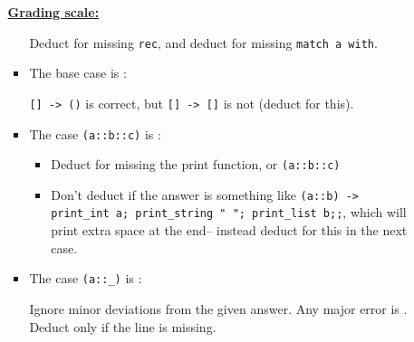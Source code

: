 \documentclass[11pt,fleqn]{article}
\begin{document}
\begin{enumerate}
\begin{enumerate}
\begin{info}{\textbf{\underline{Grading scale:}}}
\begin{itemize}
                            \smallskip

                            Deduct  for missing \texttt{rec}, and
                            deduct  for missing \texttt{match a
                            with}.

                      \item The base case is :

                            \smallskip

                            \texttt{[] -> ()} is correct, but \texttt{[] ->
                            []} is not (deduct  for this).

                      \item The case \texttt{(a::b::c)} is :

                            \vspace{0mm}

                            \begin{itemize}

                              \addtolength{\itemsep}{-1mm}

                              \item Deduct  for missing the print
                                    function, or \texttt{(a::b::c)}

                              \item Don't deduct if the answer is something
                                    like \texttt{(a::b) -> print\_int a;
                                      print\_string " "; print\_list b;;},
                                    which will print extra space at the
                                    end-- instead deduct for this in the
                                    next case.

                            \end{itemize}

                            \vspace{0mm}

                      \item The case \texttt{(a::\_)} is :

                            \smallskip

                            Ignore minor deviations from the given answer.
                            Any major error is .  Deduct 
                            only if the line is missing.


\end{itemize}
\end{info}
\end{enumerate}
\end{enumerate}
\end{document}

